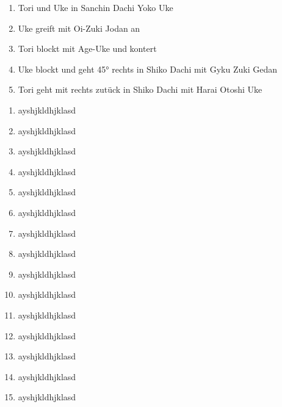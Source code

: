 	\null\vfill\null
\begin{center}
	\begin{minipage}[t]{\textwidth-2\tabcolsep}
		{
		\begin{enumerate}
			\item Tori und Uke in Sanchin Dachi Yoko Uke
			\item Uke greift mit Oi-Zuki Jodan an
			\item Tori blockt mit Age-Uke und kontert
			\item Uke blockt und geht 45° rechts in Shiko Dachi mit Gyku Zuki Gedan
			\item Tori geht mit rechts zutück in Shiko Dachi mit Harai Otoshi Uke
		\end{enumerate}
		\begin{multicols}{3}
			\begin{enumerate}
				\item ayshjkldhjklasd
				\item ayshjkldhjklasd
				\item ayshjkldhjklasd
				\item ayshjkldhjklasd
				\item ayshjkldhjklasd
				\item ayshjkldhjklasd
				\item ayshjkldhjklasd
				\item ayshjkldhjklasd
				\item ayshjkldhjklasd
				\item ayshjkldhjklasd
				\item ayshjkldhjklasd
				\item ayshjkldhjklasd
				\item ayshjkldhjklasd
				\item ayshjkldhjklasd
				\item ayshjkldhjklasd
			\end{enumerate}
		\end{multicols}
}
\end{minipage}
\end{center}
